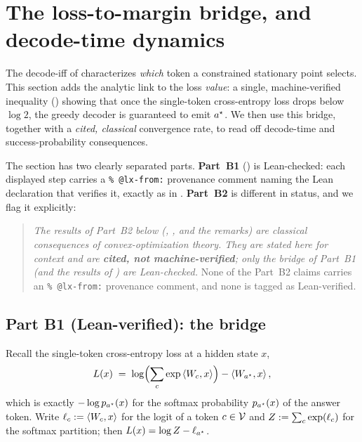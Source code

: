 \section{The loss-to-margin bridge, and decode-time dynamics}
\label{sec:bridge-and-dynamics}

The decode-iff of  characterizes \emph{which} token a constrained
stationary point selects. This section adds the analytic link to the loss \emph{value}: a
single, machine-verified inequality () showing that once the
single-token cross-entropy loss drops below $\log 2$, the greedy decoder is guaranteed to emit
$a^{\star}$. We then use this bridge, together with a \emph{cited, classical} convergence rate, to
read off decode-time and success-probability consequences.

The section has two clearly separated parts. \textbf{Part~B1} ()
is Lean-checked: each displayed step carries a \verb|% @lx-from:| provenance comment naming the
Lean declaration that verifies it, exactly as in .
\textbf{Part~B2} is different in status, and we flag it explicitly:

\begin{quote}
\emph{The results of Part~B2 below (, , and the
remarks) are classical consequences of convex-optimization theory. They are stated here for
context and are \textbf{cited, not machine-verified}; only the bridge of Part~B1 (and the
results of ) are Lean-checked.} None of the Part~B2 claims
carries an \verb|% @lx-from:| provenance comment, and none is tagged as Lean-verified.
\end{quote}

\subsection{Part B1 (Lean-verified): the bridge}
\label{sec:bridge-verified}

Recall the single-token cross-entropy loss at a hidden state $x$,
\begin{align*}
L(x) \;=\; \log\Bigl(\sum_{c} \exp\left\langle W_c, x \right\rangle\Bigr) - \left\langle W_{a^{\star}}, x \right\rangle,
\end{align*}
which is exactly $-\log p_{a^{\star}}(x)$ for the softmax probability $p_{a^{\star}}(x)$ of the answer
token. Write $\ell_{c} := \left\langle W_c, x \right\rangle$ for the logit of a token $c \in \mathcal{V}$ and %
$Z := \sum_{c} \exp(\ell_{c})$ for the softmax partition; then $L(x) = \log Z - \ell_{a^{\star}}$.

